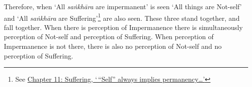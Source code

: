Therefore, when `All \emph{saṅkhāra} are impermanent' is seen `All things are Not-self' and `All \emph{saṅkhāra} are Suffering'\footnote{See \href{ch-11-suffering.xml\#impermanent}{Chapter 11: Suffering, `\,``Self'' always implies permanency\ldots\hspace{0pt}'}} are also seen. These three stand together, and fall together. When there is perception of Impermanence there is simultaneously perception of Not-self and perception of Suffering. When perception of Impermanence is not there, there is also no perception of Not-self and no perception of Suffering.

